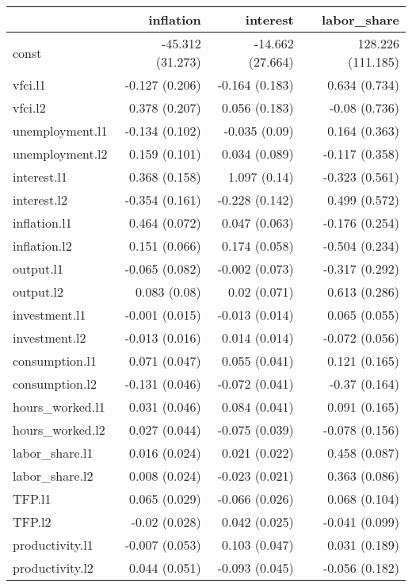 \begin{longtable}{l|rrr}
\toprule
\multicolumn{1}{l}{} & inflation & interest & labor\_share \\ 
\midrule\addlinespace[2.5pt]
const & -45.312 (31.273) & -14.662 (27.664) & 128.226 (111.185) \\ 
vfci.l1 & -0.127 (0.206) & -0.164 (0.183) & 0.634 (0.734) \\ 
vfci.l2 & 0.378 (0.207) & 0.056 (0.183) & -0.08 (0.736) \\ 
unemployment.l1 & -0.134 (0.102) & -0.035 (0.09) & 0.164 (0.363) \\ 
unemployment.l2 & 0.159 (0.101) & 0.034 (0.089) & -0.117 (0.358) \\ 
interest.l1 & 0.368 (0.158) & 1.097 (0.14) & -0.323 (0.561) \\ 
interest.l2 & -0.354 (0.161) & -0.228 (0.142) & 0.499 (0.572) \\ 
inflation.l1 & 0.464 (0.072) & 0.047 (0.063) & -0.176 (0.254) \\ 
inflation.l2 & 0.151 (0.066) & 0.174 (0.058) & -0.504 (0.234) \\ 
output.l1 & -0.065 (0.082) & -0.002 (0.073) & -0.317 (0.292) \\ 
output.l2 & 0.083 (0.08) & 0.02 (0.071) & 0.613 (0.286) \\ 
investment.l1 & -0.001 (0.015) & -0.013 (0.014) & 0.065 (0.055) \\ 
investment.l2 & -0.013 (0.016) & 0.014 (0.014) & -0.072 (0.056) \\ 
consumption.l1 & 0.071 (0.047) & 0.055 (0.041) & 0.121 (0.165) \\ 
consumption.l2 & -0.131 (0.046) & -0.072 (0.041) & -0.37 (0.164) \\ 
hours\_worked.l1 & 0.031 (0.046) & 0.084 (0.041) & 0.091 (0.165) \\ 
hours\_worked.l2 & 0.027 (0.044) & -0.075 (0.039) & -0.078 (0.156) \\ 
labor\_share.l1 & 0.016 (0.024) & 0.021 (0.022) & 0.458 (0.087) \\ 
labor\_share.l2 & 0.008 (0.024) & -0.023 (0.021) & 0.363 (0.086) \\ 
TFP.l1 & 0.065 (0.029) & -0.066 (0.026) & 0.068 (0.104) \\ 
TFP.l2 & -0.02 (0.028) & 0.042 (0.025) & -0.041 (0.099) \\ 
productivity.l1 & -0.007 (0.053) & 0.103 (0.047) & 0.031 (0.189) \\ 
productivity.l2 & 0.044 (0.051) & -0.093 (0.045) & -0.056 (0.182) \\ 
\bottomrule
\end{longtable}
